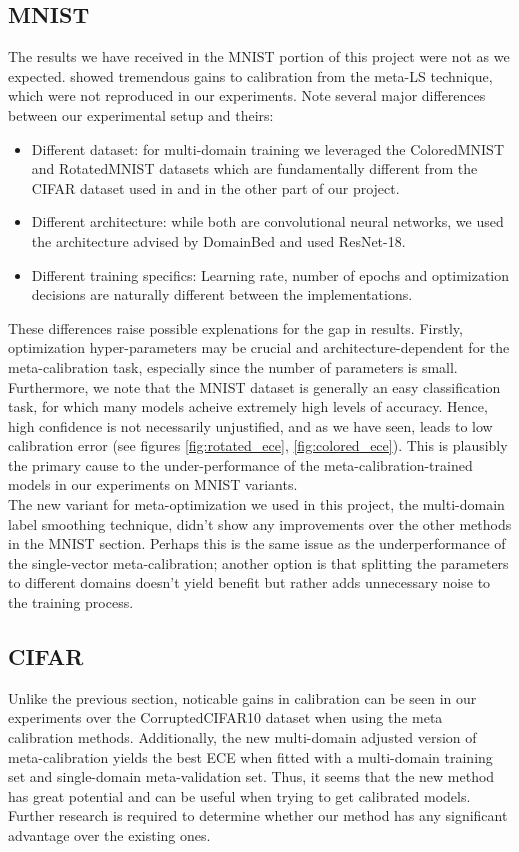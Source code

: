 \documentclass[12pt,a4paper]{article}
\begin{document}
\subsection{MNIST}
The results we have received in the MNIST portion of this project were not as we expected. \cite{bohdal2021meta} showed tremendous gains to calibration from the meta-LS technique, which were not reproduced in our experiments. Note several major differences between our experimental setup and theirs:
\begin{itemize}
	\item Different dataset: for multi-domain training we leveraged the ColoredMNIST and RotatedMNIST datasets which are fundamentally different from the CIFAR dataset used in \cite{bohdal2021meta} and in the other part of our project.
	\item Different architecture: while both are convolutional neural networks, we used the architecture advised by DomainBed and \cite{bohdal2021meta} used ResNet-18.
	\item Different training specifics: Learning rate, number of epochs and optimization decisions are naturally different between the implementations.
\end{itemize}
These differences raise possible explenations for the gap in results. Firstly, optimization hyper-parameters may be crucial and architecture-dependent for the meta-calibration task, especially since the number of parameters is small. Furthermore, we note that the MNIST dataset is generally an easy classification task, for which many models acheive extremely high levels of accuracy. Hence, high confidence is not necessarily unjustified, and as we have seen, leads to low calibration error (see figures \ref{fig:rotated_ece}, \ref{fig:colored_ece}). This is plausibly the primary cause to the under-performance of the meta-calibration-trained models in our experiments on MNIST variants.\\
The new variant for meta-optimization we used in this project, the multi-domain label smoothing technique, didn't show any improvements over the other methods in the MNIST section. Perhaps this is the same issue as the underperformance of the single-vector meta-calibration; another option is that splitting the parameters to different domains doesn't yield benefit but rather adds unnecessary noise to the training process.\\

\subsection{CIFAR}
Unlike the previous section, noticable gains in calibration can be seen in our experiments over the CorruptedCIFAR10 dataset when using the meta calibration methods. Additionally, the new multi-domain adjusted version of meta-calibration yields the best ECE when fitted with a multi-domain training set and single-domain meta-validation set. Thus, it seems that the new method has great potential and can be useful when trying to get calibrated models. Further research is required to determine whether our method has any significant advantage over the existing ones.
\end{document}
